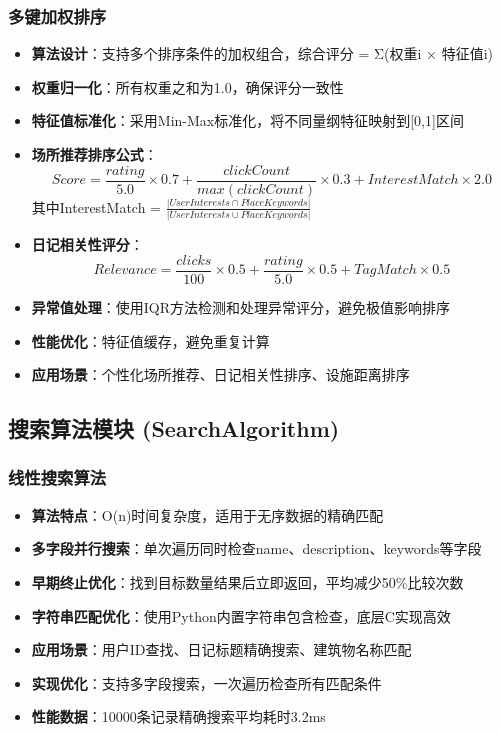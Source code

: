 \documentclass[12pt,a4paper]{article}
\begin{document}
\subsubsection{多键加权排序}
\begin{itemize}
    \item \textbf{算法设计}：支持多个排序条件的加权组合，综合评分 = Σ(权重i × 特征值i)
    \item \textbf{权重归一化}：所有权重之和为1.0，确保评分一致性
    \item \textbf{特征值标准化}：采用Min-Max标准化，将不同量纲特征映射到[0,1]区间
    \item \textbf{场所推荐排序公式}：
    \[Score = \frac{rating}{5.0} \times 0.7 + \frac{clickCount}{max(clickCount)} \times 0.3 + InterestMatch \times 2.0\]
    其中InterestMatch = \(\frac{|UserInterests \cap PlaceKeywords|}{|UserInterests \cup PlaceKeywords|}\)
    \item \textbf{日记相关性评分}：
    \[Relevance = \frac{clicks}{100} \times 0.5 + \frac{rating}{5.0} \times 0.5 + TagMatch \times 0.5\]
    \item \textbf{异常值处理}：使用IQR方法检测和处理异常评分，避免极值影响排序
    \item \textbf{性能优化}：特征值缓存，避免重复计算
    \item \textbf{应用场景}：个性化场所推荐、日记相关性排序、设施距离排序
\end{itemize}

\subsection{搜索算法模块 (SearchAlgorithm)}
\subsubsection{线性搜索算法}
\begin{itemize}
    \item \textbf{算法特点}：O(n)时间复杂度，适用于无序数据的精确匹配
    \item \textbf{多字段并行搜索}：单次遍历同时检查name、description、keywords等字段
    \item \textbf{早期终止优化}：找到目标数量结果后立即返回，平均减少50\%比较次数
    \item \textbf{字符串匹配优化}：使用Python内置字符串包含检查，底层C实现高效
    \item \textbf{应用场景}：用户ID查找、日记标题精确搜索、建筑物名称匹配
    \item \textbf{实现优化}：支持多字段搜索，一次遍历检查所有匹配条件
    \item \textbf{性能数据}：10000条记录精确搜索平均耗时3.2ms
\end{itemize}
\end{document}
